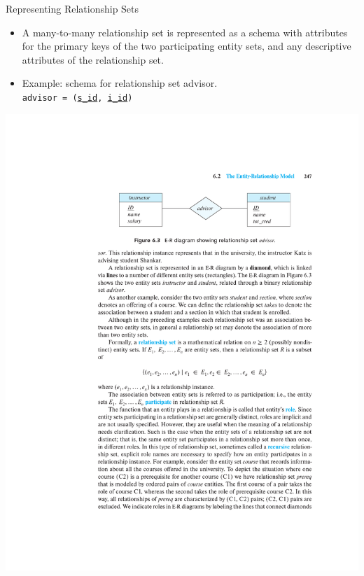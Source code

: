 \documentclass{beamer}
\begin{document}
\begin{frame}{Representing Relationship Sets}
    \begin{itemize}
        \item A many-to-many relationship set is represented as a schema with attributes for the primary keys of the two participating entity sets, and any descriptive attributes of the relationship set.
        \item Example: schema for relationship set advisor. \\
        \texttt{advisor = (\underline{s\_id}, \underline{i\_id})}
    \end{itemize}
    \centering
    \includegraphics[trim={6.90cm 21cm 4.15cm 4cm}, clip, width=\textwidth]{figures/p247}
\end{frame}
\end{document}
